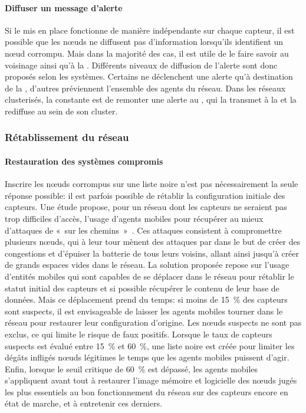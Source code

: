         \paragraph{Diffuser un message d'alerte}
Si le \ids mis en place fonctionne de manière indépendante sur chaque capteur, il est possible que les nœuds ne diffusent pas d'information lorsqu'ils identifient un nœud corrompu.
Mais dans la majorité des cas, il est utile de le faire savoir au voisinage ainsi qu'à la \sdb.
Différents niveaux de diffusion de l'alerte sont donc proposés selon les systèmes.
Certains ne déclenchent une alerte qu'à destination de la \sdb, d'autres préviennent l'ensemble des agents du réseau.
Dans les réseaux clusterisés, la constante est de remonter une alerte au \ch, qui la transmet à la \sdb et la rediffuse au sein de son cluster.

    \subsubsection{Rétablissement du réseau}
        \paragraph{Restauration des systèmes compromis}
Inscrire les nœuds corrompus sur une liste noire n'est pas nécessairement la seule réponse possible: il est parfois possible de rétablir la configuration initiale des capteurs.
Une étude propose, pour un réseau dont les capteurs ne seraient pas trop difficiles d'accès, l'usage d'agents mobiles pour récupérer au mieux d'attaques de \dds « sur les chemins »~\cite{LB09}.
Ces attaques consistent à compromettre plusieurs nœuds, qui à leur tour mènent des attaques par \deluge dans le but de créer des congestions et d'épuiser la batterie de tous leurs voisins, allant ainsi jusqu'à créer de grands espaces vides dans le réseau.
La solution proposée repose sur l'usage d'entités mobiles qui sont capables de se déplacer dans le réseau pour rétablir le statut initial des capteurs et si possible récupérer le contenu de leur base de données.
Mais ce déplacement prend du temps: si moins de 15~\% des capteurs sont suspects, il est envisageable de laisser les agents mobiles tourner dans le réseau pour restaurer leur configuration d'origine.
Les nœuds suspects ne sont pas exclus, ce qui limite le risque de faux positifs.
Lorsque le taux de capteurs suspects est évalué entre 15~\% et 60~\%, une liste noire est créée pour limiter les dégâts infligés nœuds légitimes le temps que les agents mobiles puissent d'agir.
Enfin, lorsque le seuil critique de 60~\% est dépassé, les agents mobiles s'appliquent avant tout à restaurer l'image mémoire et logicielle des nœuds jugés les plus essentiels au bon fonctionnement du réseau sur des capteurs encore en état de marche, et à entretenir ces derniers.

